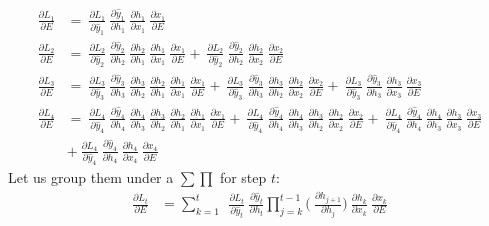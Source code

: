 \documentclass{article}
\begin{document}
\begin{align*}
\frac{\partial L_1}{ \partial{E}} & = ~\frac{\partial L_1}{ \partial \hat{y}_1}~\frac{\partial \hat{y}_1}{ \partial h_1}
  ~\frac{\partial h_1}{ \partial x_1} ~\frac{\partial x_1}{ \partial E} \\
	\frac{\partial L_2}{ \partial{E}} & = ~\frac{\partial L_2}{ \partial \hat{y}_2}~\frac{\partial \hat{y}_2}{ \partial h_2}
 ~\frac{\partial h_2}{ \partial h_1} ~\frac{\partial h_1}{ \partial x_1} ~\frac{\partial x_1}{ \partial E}	+ ~\frac{\partial L_2}{ \partial \hat{y}_2}~\frac{\partial \hat{y}_2}{ \partial h_2}
  ~\frac{\partial h_2}{ \partial x_2} ~\frac{\partial x_2}{ \partial E} \\
 \frac{\partial L_3}{ \partial{E}} & = ~\frac{\partial L_3}{ \partial \hat{y}_3}~\frac{\partial \hat{y}_3}{ \partial h_3}
 ~\frac{\partial h_3}{ \partial h_2} ~\frac{\partial h_2}{ \partial h_1} ~\frac{\partial h_1}{ \partial x_1} ~\frac{\partial x_1}{ \partial E}	+ ~\frac{\partial L_3}{ \partial \hat{y}_3}~\frac{\partial \hat{y}_3}{ \partial h_3}
 ~\frac{\partial h_3}{ \partial h_2} ~\frac{\partial h_2}{ \partial x_2} ~\frac{\partial x_2}{ \partial E} +  ~\frac{\partial L_3}{ \partial \hat{y}_3}~\frac{\partial \hat{y}_3}{ \partial h_3}
  ~\frac{\partial h_3}{ \partial x_3} ~\frac{\partial x_3}{ \partial E} \\
 \frac{\partial L_4}{ \partial{E}} & = ~\frac{\partial L_4}{ \partial \hat{y}_4}~\frac{\partial \hat{y}_4}{ \partial h_4}
 ~\frac{\partial h_4}{ \partial h_3}~\frac{\partial h_3}{ \partial h_2}~\frac{\partial h_2}{ \partial h_1} ~\frac{\partial h_1}{ \partial x_1} ~\frac{\partial x_1}{ \partial E}	+ ~\frac{\partial L_4}{ \partial \hat{y}_4}~\frac{\partial \hat{y}_4}{ \partial h_4}
 ~\frac{\partial h_4}{ \partial h_3} ~\frac{\partial h_3}{ \partial h_2} ~\frac{\partial h_2}{ \partial x_2} ~\frac{\partial x_2}{ \partial E} +  ~\frac{\partial L_4}{ \partial \hat{y}_4}~\frac{\partial \hat{y}_4}{ \partial h_4}
 ~\frac{\partial h_4}{ \partial h_3} ~\frac{\partial h_3}{ \partial x_3} ~\frac{\partial x_3}{ \partial E} \\& + ~\frac{\partial L_4}{ \partial \hat{y}_4}~\frac{\partial \hat{y}_4}{ \partial h_4}
  ~\frac{\partial h_4}{ \partial x_4} ~\frac{\partial x_4}{ \partial E}
\end{align*}
Let us group them under a $\sum \prod$  for step $t$:
\begin{align*}
	\frac{\partial L_t}{ \partial{E}} & = \sum_{k=1}^{t} ~
	~\frac{\partial L_t}{\partial \hat{y}_t}
	~\frac{\partial \hat{y}_t}{\partial h_t}
        \prod_{j=k}^{t-1} \bigg(
	~\frac{\partial h_{j+1}}{\partial h_{j}}
        \bigg)
	~\frac{\partial h_k}{\partial x_k}~\frac{\partial x_k}{\partial E}
\end{align*}
\end{document}
